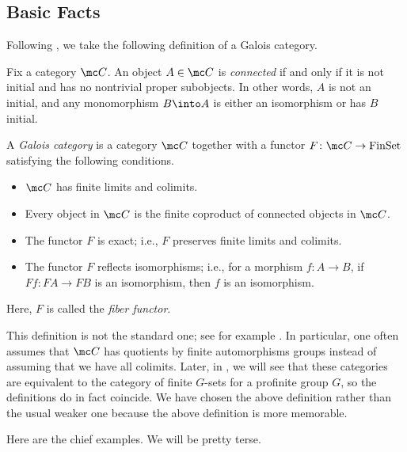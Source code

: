 \documentclass{amsart}
\begin{document}
\subsection{Basic Facts}
Following \cite[\href{https://stacks.math.columbia.edu/tag/0BMY}{Definition 0BMY}]{stacks}, we take the following definition of a Galois category.
\begin{definition}[connected]
    Fix a category $\mc C$. An object $A\in\mc C$ is \textit{connected} if and only if it is not initial and has no nontrivial proper subobjects. In other words, $A$ is not an initial, and any monomorphism $B\into A$ is either an isomorphism or has $B$ initial.
\end{definition}
\begin{definition}
    A \textit{Galois category} is a category $\mc C$ together with a functor $F\colon\mc C\to\mathrm{FinSet}$ satisfying the following conditions.
    \begin{itemize}
        \item $\mc C$ has finite limits and colimits.
        \item Every object in $\mc C$ is the finite coproduct of connected objects in $\mc C$.
        \item The functor $F$ is exact; i.e., $F$ preserves finite limits and colimits.
        \item The functor $F$ reflects isomorphisms; i.e., for a morphism $f\colon A\to B$, if $Ff\colon FA\to FB$ is an isomorphism, then $f$ is an isomorphism.
    \end{itemize}
    Here, $F$ is called the \textit{fiber functor}.
\end{definition}
\begin{remark}
    This definition is not the standard one; see for example \cite[Definition~2.1]{cadoret-galois}. In particular, one often assumes that $\mc C$ has quotients by finite automorphisms groups instead of assuming that we have all colimits. Later, in , we will see that these categories are equivalent to the category of finite $G$-sets for a profinite group $G$, so the definitions do in fact coincide. We have chosen the above definition rather than the usual weaker one because the above definition is more memorable.
\end{remark}
Here are the chief examples. We will be pretty terse.
\end{document}
